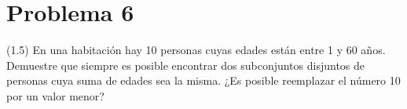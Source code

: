 
\section*{Problema 6}
(1.5) En una habitación hay 10 personas cuyas edades están entre 1 y 60 años. Demuestre que siempre es posible encontrar dos subconjuntos disjuntos de personas cuya suma de edades sea la misma. ¿Es posible reemplazar el número 10 por un valor menor?

